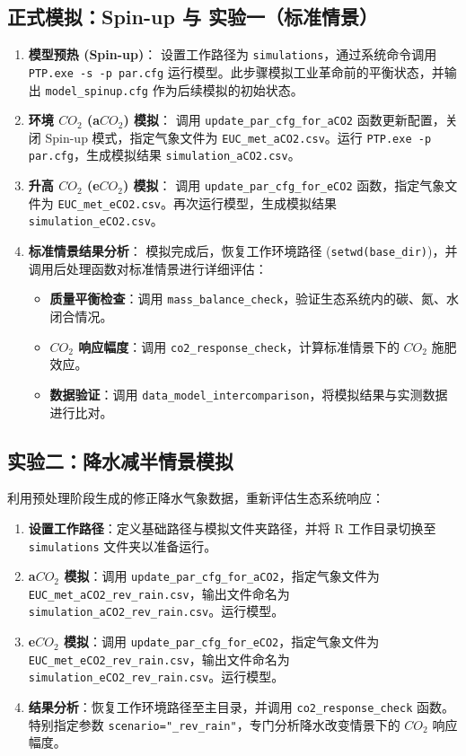 \documentclass[10pt]{config}
\begin{document}
\subsection{正式模拟：Spin-up 与 实验一（标准情景）}
\begin{enumerate}
    \item \textbf{模型预热 (Spin-up)}：
    设置工作路径为 \texttt{simulations}，通过系统命令调用 \texttt{PTP.exe -s -p par.cfg} 运行模型。此步骤模拟工业革命前的平衡状态，并输出 \texttt{model\_spinup.cfg} 作为后续模拟的初始状态。
    \item \textbf{环境 $CO_2$ (a$CO_2$) 模拟}：
    调用 \texttt{update\_par\_cfg\_for\_aCO2} 函数更新配置，关闭 Spin-up 模式，指定气象文件为 \texttt{EUC\_met\_aCO2.csv}。运行 \texttt{PTP.exe -p par.cfg}，生成模拟结果 \texttt{simulation\_aCO2.csv}。
    \item \textbf{升高 $CO_2$ (e$CO_2$) 模拟}：
    调用 \texttt{update\_par\_cfg\_for\_eCO2} 函数，指定气象文件为 \texttt{EUC\_met\_eCO2.csv}。再次运行模型，生成模拟结果 \texttt{simulation\_eCO2.csv}。
    \item \textbf{标准情景结果分析}：
    模拟完成后，恢复工作环境路径 (\texttt{setwd(base\_dir)})，并调用后处理函数对标准情景进行详细评估：
    \begin{itemize}
        \item \textbf{质量平衡检查}：调用 \texttt{mass\_balance\_check}，验证生态系统内的碳、氮、水闭合情况。
        \item \textbf{$CO_2$ 响应幅度}：调用 \texttt{co2\_response\_check}，计算标准情景下的 $CO_2$ 施肥效应。
        \item \textbf{数据验证}：调用 \texttt{data\_model\_intercomparison}，将模拟结果与实测数据进行比对。
    \end{itemize}
\end{enumerate}

\subsection{实验二：降水减半情景模拟}
利用预处理阶段生成的修正降水气象数据，重新评估生态系统响应：
\begin{enumerate}
    \item \textbf{设置工作路径}：定义基础路径与模拟文件夹路径，并将 R 工作目录切换至 \texttt{simulations} 文件夹以准备运行。
    \item \textbf{a$CO_2$ 模拟}：调用 \texttt{update\_par\_cfg\_for\_aCO2}，指定气象文件为 \texttt{EUC\_met\_aCO2\_rev\_rain.csv}，输出文件命名为 \texttt{simulation\_aCO2\_rev\_rain.csv}。运行模型。
    \item \textbf{e$CO_2$ 模拟}：调用 \texttt{update\_par\_cfg\_for\_eCO2}，指定气象文件为 \texttt{EUC\_met\_eCO2\_rev\_rain.csv}，输出文件命名为 \texttt{simulation\_eCO2\_rev\_rain.csv}。运行模型。
    \item \textbf{结果分析}：恢复工作环境路径至主目录，并调用 \texttt{co2\_response\_check} 函数。特别指定参数 \texttt{scenario="\_rev\_rain"}，专门分析降水改变情景下的 $CO_2$ 响应幅度。
\end{enumerate}
\end{document}
